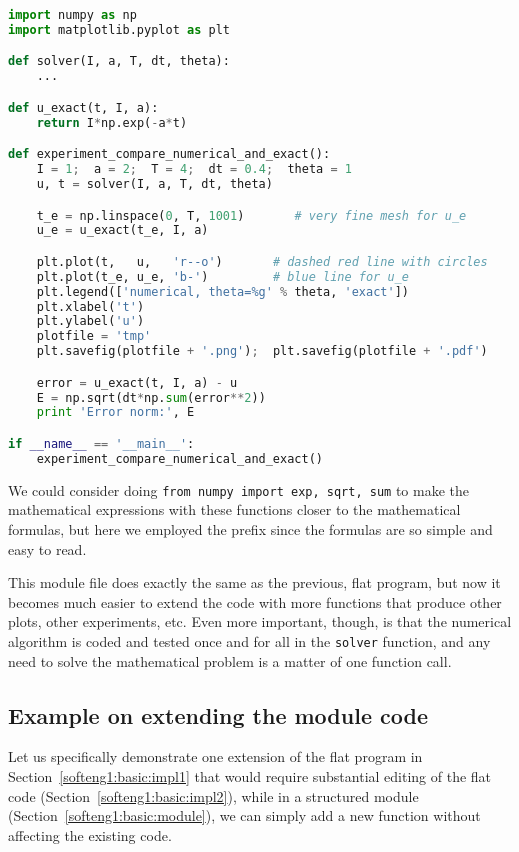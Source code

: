 \documentclass[graybox,sectrefs,envcountresetchap,open=right,final]{svmonodo}
\begin{document}
\begin{lstlisting}[language=Python,style=blue1_bluegreen]
import numpy as np
import matplotlib.pyplot as plt

def solver(I, a, T, dt, theta):
    ...

def u_exact(t, I, a):
    return I*np.exp(-a*t)

def experiment_compare_numerical_and_exact():
    I = 1;  a = 2;  T = 4;  dt = 0.4;  theta = 1
    u, t = solver(I, a, T, dt, theta)

    t_e = np.linspace(0, T, 1001)       # very fine mesh for u_e
    u_e = u_exact(t_e, I, a)

    plt.plot(t,   u,   'r--o')       # dashed red line with circles
    plt.plot(t_e, u_e, 'b-')         # blue line for u_e
    plt.legend(['numerical, theta=%g' % theta, 'exact'])
    plt.xlabel('t')
    plt.ylabel('u')
    plotfile = 'tmp'
    plt.savefig(plotfile + '.png');  plt.savefig(plotfile + '.pdf')

    error = u_exact(t, I, a) - u
    E = np.sqrt(dt*np.sum(error**2))
    print 'Error norm:', E

if __name__ == '__main__':
    experiment_compare_numerical_and_exact()
\end{lstlisting}
We could consider doing \texttt{from numpy import exp, sqrt, sum} to make
the mathematical expressions with these functions closer to the
mathematical formulas, but here we employed the prefix since the
formulas are so simple and easy to read.

This module file does exactly the same as the previous, flat program,
but now it becomes much easier to extend the code with more functions
that produce other plots, other experiments, etc. Even more important, though,
is that the numerical
algorithm is coded and tested once and for all in the \texttt{solver}
function, and any need to solve the mathematical problem is a matter
of one function call.


\subsection{Example on extending the module code}
\label{softeng1:basic:experiment2}

Let us specifically demonstrate one extension of the flat program in
Section~\ref{softeng1:basic:impl1} that would require substantial
editing of the flat code (Section~\ref{softeng1:basic:impl2}), while in
a structured module (Section~\ref{softeng1:basic:module}), we can
simply add a new function without affecting the existing code.
\end{document}
